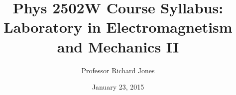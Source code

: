 \documentclass{revtex4}
\begin{document}

\title{Phys 2502W Course Syllabus: Laboratory in Electromagnetism and Mechanics II}


\author{Professor Richard Jones}


\date{January 23, 2015}


\setlength{\topmargin}{0in}

\maketitle

\end{document}

